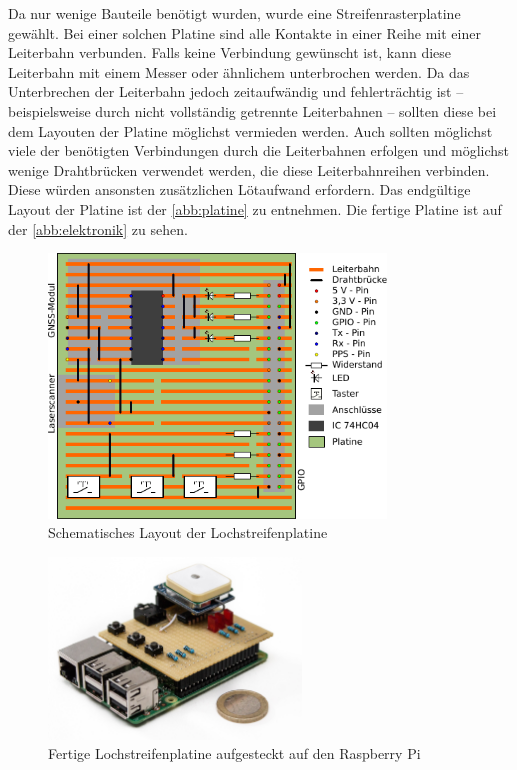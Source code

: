 \documentclass[a4paper,12pt,bibliography=totoc, listof=totoc,titlepage,pointlessnumbers]{scrreprt}
\begin{document}
Da nur wenige Bauteile benötigt wurden, wurde eine Streifenrasterplatine gewählt. Bei einer solchen Platine sind alle Kontakte in einer Reihe mit einer Leiterbahn verbunden. Falls keine Verbindung gewünscht ist, kann diese Leiterbahn mit einem Messer oder ähnlichem unterbrochen werden. Da das Unterbrechen der Leiterbahn jedoch zeitaufwändig und fehlerträchtig ist -- beispielsweise durch nicht vollständig getrennte Leiterbahnen -- sollten diese bei dem Layouten der Platine möglichst vermieden werden. Auch sollten möglichst viele der benötigten Verbindungen durch die Leiterbahnen erfolgen und möglichst wenige Drahtbrücken verwendet werden, die diese Leiterbahnreihen verbinden. Diese würden ansonsten zusätzlichen Lötaufwand erfordern. Das endgültige Layout der Platine ist der \autoref{abb:platine} zu entnehmen. Die fertige Platine ist auf der \autoref{abb:elektronik} zu sehen.

\begin{figure}[!ht]
 \centering
 \includegraphics[width=0.8\textwidth]{img/platine.pdf}
 \caption{Schematisches Layout der Lochstreifenplatine}
 \label{abb:platine}
\end{figure}

\begin{figure}[!ht]
 \centering
 \includegraphics[width=0.6\textwidth]{img/elektronik.jpg}
 \caption{Fertige Lochstreifenplatine aufgesteckt auf den Raspberry Pi}
 \label{abb:elektronik}
\end{figure}
\end{document}
